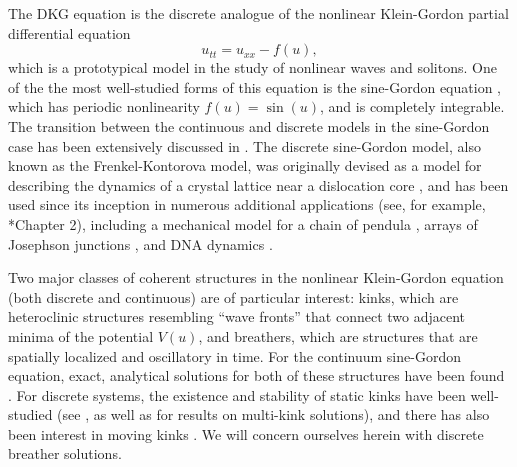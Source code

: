 \documentclass[12pt,reqno]{amsart}
\theoremstyle{definition}
\begin{document}
The DKG equation is the discrete analogue of the nonlinear Klein-Gordon partial differential equation
\begin{equation*}
u_{tt} = u_{xx} - f(u),
\end{equation*}
which is a prototypical model in the study of nonlinear waves and solitons. One of the the most well-studied forms of this equation is the sine-Gordon equation \cites{braun2004,SGbook,p4book,kivsharmalomed}, which has periodic nonlinearity $f(u)=\sin(u)$, and is completely integrable. The transition between the continuous and discrete models in the sine-Gordon case has been extensively discussed in \cite{SGchapter}. The discrete sine-Gordon model, also known as the Frenkel-Kontorova model, was originally devised as a model for describing the dynamics of a crystal lattice near a dislocation core \cites{braun1998,braun2004}, and has been  
used since its inception in numerous additional applications (see, for example, \cite{braun2004}*{Chapter 2}), including a mechanical model for a chain of pendula \cites{Scott1969,english}, arrays of Josephson junctions \cites{Ustinov1992,Floria1998}, and DNA dynamics \cites{Yomosa1983,Yakushevich1998,DeLeo2011}.

Two major classes of coherent structures in the nonlinear Klein-Gordon equation (both discrete and continuous) are of particular interest: kinks, which are heteroclinic structures resembling ``wave fronts'' that connect two adjacent minima of the potential $V(u)$, and breathers, which are structures that are spatially localized and oscillatory in time. For the continuum sine-Gordon equation, exact, analytical solutions for both of these structures have been found \cite{SolitonBook1}. 
For discrete systems, the existence and stability of static kinks have been well-studied (see \cites{PEYRARD198488,KevrekidisWeinstein2000,SGchapter}, as well as \cite{Parker2021} for results on multi-kink solutions), and there has also been interest in moving kinks \cites{Aigner2003,Iooss2006,Cisneros2008}. We will concern ourselves herein with discrete breather solutions.
\end{document}
